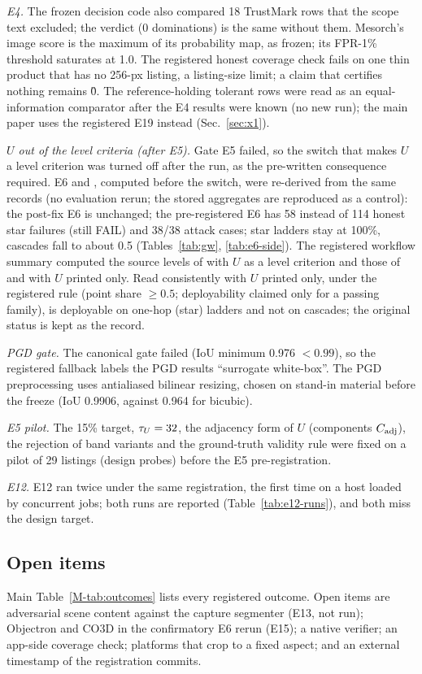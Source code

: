 \documentclass[10pt]{article}
\newcommand{\mainref}[1]{\ref{M-#1}}
\begin{document}
\emph{E4.} The frozen decision code also compared 18 TrustMark rows that the scope text excluded; the verdict (0
dominations) is the same without them. Mesorch's image score is the maximum of its probability map, as frozen; its
FPR-1\% threshold saturates at 1.0. The registered honest \tierTa{} coverage check fails on one thin product that has
no 256-px listing, a listing-size limit; a claim that certifies nothing remains \G{0}. The reference-holding tolerant
rows were read as an equal-information comparator after the E4 results were known (no new run); the main paper uses
the registered E19 instead (Sec.~\ref{sec:x1}).

\emph{$U$ out of the level criteria (after E5).} Gate E5 failed, so the switch that makes $U$ a level criterion was
turned off after the run, as the pre-written consequence required. E6 and , computed before the switch, were
re-derived from the same records (no evaluation rerun; the stored aggregates are reproduced as a control): the
post-fix E6 is unchanged; the pre-registered E6 has 58 instead of 114 honest star failures (still FAIL) and 38/38
attack cases;  star ladders stay at 100\%,  cascades fall to about 0.5 (Tables~\ref{tab:gw},
\ref{tab:e6-side}). The registered workflow summary computed the source levels of  with $U$ as a level
criterion and those of  and  with $U$ printed only. Read consistently with $U$ printed only, under the
registered rule (point share $\ge0.5$; deployability claimed only for a passing family),  is deployable on
one-hop (star) ladders and not on cascades; the original status is kept as the record.

\emph{PGD gate.} The canonical gate failed (IoU minimum 0.976 $<0.99$), so the registered fallback labels the PGD
results ``surrogate white-box''. The PGD preprocessing uses antialiased bilinear resizing, chosen on stand-in material
before the freeze (IoU 0.9906, against 0.964 for bicubic).

\emph{E5 pilot.} The 15\% target, $\tau_{U}=32$, the adjacency form of $U$ (components $C_{\mathrm{adj}}$), the rejection of band
variants and the ground-truth validity rule were fixed on a pilot of 29 listings (design probes) before the E5
pre-registration.

\emph{E12.} E12 ran twice under the same registration, the first time on a host loaded by concurrent jobs; both runs
are reported (Table~\ref{tab:e12-runs}), and both miss the design target.

\subsection{Open items}
Main Table~\mainref{tab:outcomes} lists every registered outcome. Open items are adversarial scene content against
the capture segmenter (E13, not run); Objectron and CO3D in the confirmatory E6 rerun (E15); a native verifier; an
app-side coverage check; platforms that crop to a fixed aspect; and an external timestamp of the registration
commits.
\end{document}
